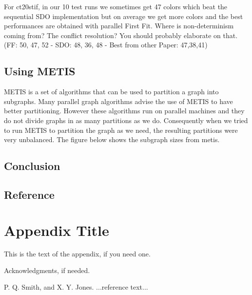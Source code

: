 \documentclass[preprint]{sigplanconf}
\begin{document}
For ct20stif, in our 10 test runs we sometimes get 47 colors which beat the sequential SDO implementation but on average we get more colors and the best performances are obtained with parallel First Fit. Where is non-determinism coming from?  The conflict resolution?  You should probably elaborate on that.
(FF: 50, 47, 52 - SDO: 48, 36, 48 - Best from other Paper: 47,38,41)\

\subsection{Using METIS}
METIS is a set of algorithms that can be used to partition a graph into subgraphs. Many parallel graph algorithms advise the use of METIS to have better partitioning. However these algorithms run on parallel machines and they do not divide graphs in as many partitions as we do. Consequently when we tried to run METIS to partition the graph as we need, the resulting partitions were very unbalanced. The figure below shows the subgraph sizes from metis.

\subsection{Conclusion}

\subsection{Reference}



\appendix
\section{Appendix Title}

This is the text of the appendix, if you need one.

\acks

Acknowledgments, if needed.





\begin{thebibliography}{}
\softraggedright

P. Q. Smith, and X. Y. Jones. ...reference text...




\end{thebibliography}
\end{document}
